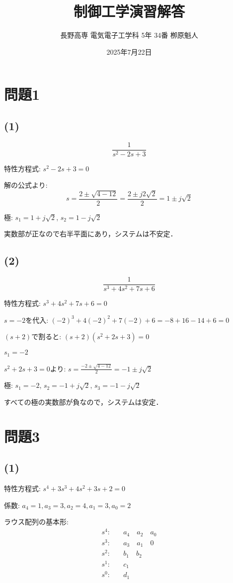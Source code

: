 \documentclass[11pt,a4paper]{ltjsarticle}
\begin{document}
\title{制御工学演習解答}
\author{長野高専 電気電子工学科 5年 34番 栁原魁人}
\date{2025年7月22日}
\maketitle

\section{問題1}

\subsection{(1)}
$$\frac{1}{s^2-2s+3}$$

特性方程式: $s^2-2s+3=0$

解の公式より:
$$s = \frac{2 \pm \sqrt{4-12}}{2} = \frac{2 \pm j2\sqrt{2}}{2} = 1 \pm j\sqrt{2}$$

極: $s_1=1+j\sqrt{2}$, $s_2=1-j\sqrt{2}$

実数部が正なので右半平面にあり，システムは不安定．

\subsection{(2)}
$$\frac{1}{s^3+4s^2+7s+6}$$

特性方程式: $s^3+4s^2+7s+6=0$

$s=-2$を代入: $(-2)^3+4(-2)^2+7(-2)+6=-8+16-14+6=0$

$(s+2)$で割ると: $(s+2)(s^2+2s+3)=0$

$s_1=-2$

$s^2+2s+3=0$より: $s = \frac{-2 \pm \sqrt{4-12}}{2} = -1 \pm j\sqrt{2}$

極: $s_1=-2$, $s_2=-1+j\sqrt{2}$, $s_3=-1-j\sqrt{2}$

すべての極の実数部が負なので，システムは安定．

\section{問題3}

\subsection{(1)}
特性方程式: $s^4+3s^3+4s^2+3s+2=0$

係数: $a_4=1, a_3=3, a_2=4, a_1=3, a_0=2$

ラウス配列の基本形:
\begin{align*}
s^4: & \quad a_4 \quad a_2 \quad a_0 \\
s^3: & \quad a_3 \quad a_1 \quad 0 \\
s^2: & \quad b_1 \quad b_2 \\
s^1: & \quad c_1 \\
s^0: & \quad d_1
\end{align*}
\end{document}
